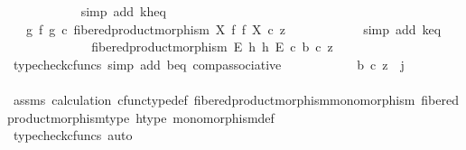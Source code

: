 \begin{isabellebody}
\ \ \ \ \ \ \ \ \ \ \isamarkupfalse%
\ {\isacharparenleft}{\kern0pt}simp\ add{\isacharcolon}{\kern0pt}\ k{\isacharunderscore}{\kern0pt}h{\isacharunderscore}{\kern0pt}eq{\isacharparenright}{\kern0pt}\isanewline
\ \ \ \ \ \ \ \ \isamarkupfalse%
\ \isamarkupfalse%
\ {\isachardoublequoteopen}{\isachardot}{\kern0pt}{\isachardot}{\kern0pt}{\isachardot}{\kern0pt}\ {\isacharequal}{\kern0pt}\ {\isacharparenleft}{\kern0pt}g\ {\isasymtimes}\isactrlsub f\ g{\isacharparenright}{\kern0pt}\ {\isasymcirc}\isactrlsub c\ fibered{\isacharunderscore}{\kern0pt}product{\isacharunderscore}{\kern0pt}morphism\ X\ f\ f\ X\ {\isasymcirc}\isactrlsub c\ z{\isachardoublequoteclose}\isanewline
\ \ \ \ \ \ \ \ \ \ \isamarkupfalse%
\ {\isacharparenleft}{\kern0pt}simp\ add{\isacharcolon}{\kern0pt}\ k{\isacharunderscore}{\kern0pt}eq{\isacharparenright}{\kern0pt}\isanewline
\ \ \ \ \ \ \ \ \isamarkupfalse%
\ \isamarkupfalse%
\ {\isachardoublequoteopen}{\isachardot}{\kern0pt}{\isachardot}{\kern0pt}{\isachardot}{\kern0pt}\ {\isacharequal}{\kern0pt}\ fibered{\isacharunderscore}{\kern0pt}product{\isacharunderscore}{\kern0pt}morphism\ E\ h\ h\ E\ {\isasymcirc}\isactrlsub c\ b\ {\isasymcirc}\isactrlsub c\ z{\isachardoublequoteclose}\isanewline
\ \ \ \ \ \ \ \ \ \ \isamarkupfalse%
\ {\isacharparenleft}{\kern0pt}typecheck{\isacharunderscore}{\kern0pt}cfuncs{\isacharcomma}{\kern0pt}\ simp\ add{\isacharcolon}{\kern0pt}\ b{\isacharunderscore}{\kern0pt}eq\ comp{\isacharunderscore}{\kern0pt}associative{}{\isacharparenright}{\kern0pt}\isanewline
\ \ \ \ \ \ \ \ \isamarkupfalse%
\ \isamarkupfalse%
\ {\isachardoublequoteopen}b\ {\isasymcirc}\isactrlsub c\ z\ {\isacharequal}{\kern0pt}\ j{\isachardoublequoteclose}\isanewline
\ \ \ \ \ \ \ \ \ \ \isamarkupfalse%
\ assms{\isacharparenleft}{\kern0pt}{}{\isacharparenright}{\kern0pt}\ calculation\ cfunc{\isacharunderscore}{\kern0pt}type{\isacharunderscore}{\kern0pt}def\ fibered{\isacharunderscore}{\kern0pt}product{\isacharunderscore}{\kern0pt}morphism{\isacharunderscore}{\kern0pt}monomorphism\ fibered{\isacharunderscore}{\kern0pt}product{\isacharunderscore}{\kern0pt}morphism{\isacharunderscore}{\kern0pt}type\ h{\isacharunderscore}{\kern0pt}type\ monomorphism{\isacharunderscore}{\kern0pt}def\isanewline
\ \ \ \ \ \ \ \ \ \ \isamarkupfalse%
\ {\isacharparenleft}{\kern0pt}typecheck{\isacharunderscore}{\kern0pt}cfuncs{\isacharcomma}{\kern0pt}\ auto{\isacharparenright}{\kern0pt}\isanewline

\end{isabellebody}
